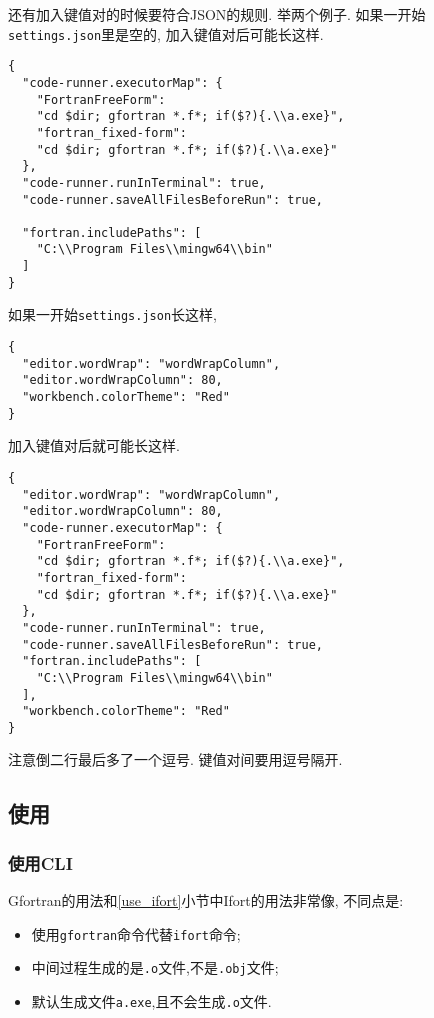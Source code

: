 还有加入键值对的时候要符合JSON的规则. 举两个例子.
如果一开始\verb|settings.json|里是空的, 加入键值对后可能长这样.
\begin{verbatim}
{
  "code-runner.executorMap": {
    "FortranFreeForm":
    "cd $dir; gfortran *.f*; if($?){.\\a.exe}",
    "fortran_fixed-form":
    "cd $dir; gfortran *.f*; if($?){.\\a.exe}"
  },
  "code-runner.runInTerminal": true,
  "code-runner.saveAllFilesBeforeRun": true,

  "fortran.includePaths": [
    "C:\\Program Files\\mingw64\\bin"
  ]
}
\end{verbatim}
如果一开始\verb|settings.json|长这样,
\begin{verbatim}
{
  "editor.wordWrap": "wordWrapColumn",
  "editor.wordWrapColumn": 80,
  "workbench.colorTheme": "Red"
}
\end{verbatim}
加入键值对后就可能长这样.
\begin{verbatim}
{
  "editor.wordWrap": "wordWrapColumn",
  "editor.wordWrapColumn": 80,
  "code-runner.executorMap": {
    "FortranFreeForm":
    "cd $dir; gfortran *.f*; if($?){.\\a.exe}",
    "fortran_fixed-form":
    "cd $dir; gfortran *.f*; if($?){.\\a.exe}"
  },
  "code-runner.runInTerminal": true,
  "code-runner.saveAllFilesBeforeRun": true,
  "fortran.includePaths": [
    "C:\\Program Files\\mingw64\\bin"
  ],
  "workbench.colorTheme": "Red"
}
\end{verbatim}
注意倒二行最后多了一个逗号. 键值对间要用逗号隔开.

\subsection{使用}\label{use_gfortran}

\subsubsection{使用CLI}
Gfortran的用法和\ref{use_ifort}小节中Ifort的用法非常像, 不同点是:
\begin{itemize}
  \item 使用\verb|gfortran|命令代替\verb|ifort|命令;
  \item 中间过程生成的是\verb|.o|文件,不是\verb|.obj|文件;
  \item 默认生成文件\verb|a.exe|,且不会生成\verb|.o|文件.
\end{itemize}

